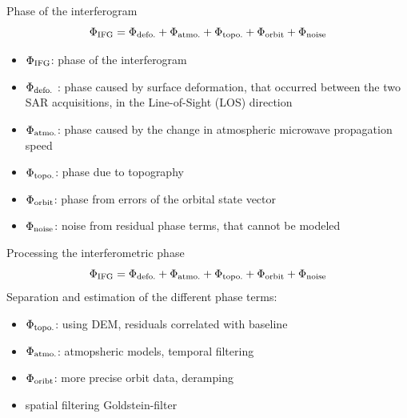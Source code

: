 \documentclass{beamer}
\begin{document}
\begin{frame}{Phase of the interferogram}
    \[
        \Phi_{\text{IFG}} = \Phi_{\text{defo.}} + \Phi_{\text{atmo.}} + \Phi_{\text{topo.}} + \Phi_{\text{orbit}} + \Phi_{\text{noise}}
    \]
    \begin{itemize}
        \item $\Phi_{\text{IFG}}$: phase of the interferogram 
        \item $\Phi_{\text{defo.}}$ : phase caused by surface deformation, that occurred between the two SAR acquisitions, in the Line-of-Sight (LOS) direction
        \item $\Phi_{\text{atmo.}}$: phase caused by the change in atmospheric microwave propagation speed
        \item $\Phi_{\text{topo.}}$: phase due to topography
        \item $\Phi_{\text{orbit}}$: phase from errors of the orbital state vector
        \item $\Phi_{\text{noise}}$: noise from residual phase terms, that cannot be modeled
    \end{itemize}    
\end{frame}


\begin{frame}{Processing the interferometric phase}
    \[
        \Phi_{\text{IFG}} = \Phi_{\text{defo.}} + \Phi_{\text{atmo.}} + \Phi_{\text{topo.}} + \Phi_{\text{orbit}} + \Phi_{\text{noise}}
    \]
    Separation and estimation of the different phase terms:
    \begin{itemize}
        \item $\Phi_{\text{topo.}}$: using DEM, residuals correlated with baseline
        \item $\Phi_{\text{atmo.}}$: atmopsheric models, temporal filtering
        \item $\Phi_{\text{oribt}}$: more precise orbit data, deramping
        \item spatial filtering Goldstein-filter \cite{GoldsteinFilter}
    \end{itemize}
\end{frame}
\end{document}
